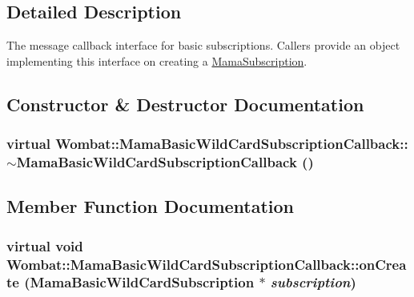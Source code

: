 \subsection{Detailed Description}
The message callback interface for basic subscriptions. Callers provide an object implementing this interface on creating a {\ttfamily \hyperlink{classWombat_1_1MamaSubscription}{MamaSubscription}}. 

\subsection{Constructor \& Destructor Documentation}
\hypertarget{classWombat_1_1MamaBasicWildCardSubscriptionCallback_a560e1a8de5344d6075f5126616f97a73}{
\subsubsection[{$\sim$MamaBasicWildCardSubscriptionCallback}]{\setlength{\rightskip}{0pt plus 5cm}virtual Wombat::MamaBasicWildCardSubscriptionCallback::$\sim$MamaBasicWildCardSubscriptionCallback ()}}
\label{classWombat_1_1MamaBasicWildCardSubscriptionCallback_a560e1a8de5344d6075f5126616f97a73}


\subsection{Member Function Documentation}
\hypertarget{classWombat_1_1MamaBasicWildCardSubscriptionCallback_aa301ef6cc86858276e6ca9008c738717}{
\subsubsection[{onCreate}]{\setlength{\rightskip}{0pt plus 5cm}virtual void Wombat::MamaBasicWildCardSubscriptionCallback::onCreate ({\bf MamaBasicWildCardSubscription} $\ast$ {\em subscription})}}
\label{classWombat_1_1MamaBasicWildCardSubscriptionCallback_aa301ef6cc86858276e6ca9008c738717}


